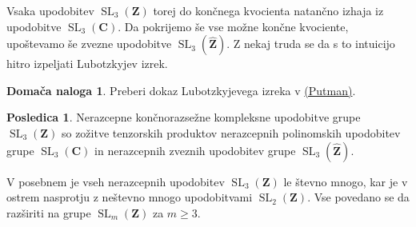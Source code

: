 \documentclass[11pt]{book}
\def\ZZ{\mathbf{Z}}
\def\CC{\mathbf{C}}
\DeclareMathOperator\SL{SL}
\theoremstyle{definition}
\theoremstyle{zgled}
\theoremstyle{odprtproblem}
\theoremstyle{domacanaloga}
\newtheorem*{domacanaloga}{Domača naloga}
\theoremstyle{izrek}
\newtheorem*{posledica}{Posledica}
\begin{document}
Vsaka upodobitev $\SL_3(\ZZ)$ torej do končnega kvocienta natančno izhaja iz upodobitve $\SL_3(\CC)$. Da pokrijemo še vse možne končne kvociente, upoštevamo še zvezne upodobitve $\SL_3(\widehat{\ZZ})$. Z nekaj truda se da s to intuicijo hitro izpeljati Lubotzkyjev izrek.

\begin{domacanaloga}
Preberi dokaz Lubotzkyjevega izreka v \href{https://www3.nd.edu/~andyp/notes/RepTheorySLnZ.pdf}{(Putman)}.
\end{domacanaloga}

\begin{posledica}
Nerazcepne končnorazsežne kompleksne upodobitve grupe $\SL_3(\ZZ)$ so zožitve tenzorskih produktov nerazcepnih polinomskih upodobitev grupe $\SL_3(\CC)$ in nerazcepnih zveznih upodobitev grupe $\SL_3(\widehat{\ZZ})$.
\end{posledica}

V posebnem je vseh nerazcepnih upodobitev $\SL_3(\ZZ)$ le števno mnogo, kar je v ostrem nasprotju z neštevno mnogo upodobitvami $\SL_2(\ZZ)$. Vse povedano se da razširiti na grupe $\SL_m(\ZZ)$ za $m \geq 3$.
\end{document}

